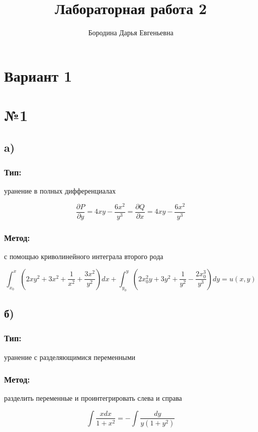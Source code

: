 \documentclass{article}
\title{Лабораторная работа 2}
\author{Бородина Дарья Евгеньевна}
\date{}
\begin{document}
\maketitle
\section*{Вариант 1}
\section*{№1}
\subsection*{a)}
\subsubsection*{Тип:} 
уранение в полных дифференциалах

\begin{equation*}
\frac{\partial P}{\partial y}=4xy-\frac{6x^2}{y^3}=
\frac{\partial Q}{\partial x}=4xy-\frac{6x^2}{y^3}
\end{equation*}

\subsubsection*{Метод:}
с помощью криволинейного интеграла второго рода

\begin{equation*}
\int_{x_0}^{x}\left(2xy^2+3x^2+\frac{1}{x^2}+\frac{3x^2}{y^2}\right)dx+\int_{y_0}^{y}\left(2x_0^2y+3y^2+\frac{1}{y^2}-\frac{2x_0^3}{y^3}\right)dy=u(x,y)
\end{equation*}

\subsection*{б)}
\subsubsection*{Тип:} 
уранение с разделяющимися переменными
\subsubsection*{Метод:} 
разделить переменные и проинтегрировать слева и справа

\begin{equation*}
\int \frac{xdx}{1+x^2}=-\int \frac{dy}{y(1+y^2)}
\end{equation*}
\end{document}
